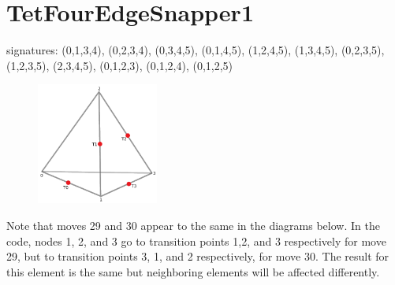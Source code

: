 \documentclass{article}
\begin{document}
\setcounter{subfigure}{0}
\clearpage


\section{TetFourEdgeSnapper1}

signatures: (0,1,3,4), (0,2,3,4), (0,3,4,5), (0,1,4,5), (1,2,4,5),
(1,3,4,5), (0,2,3,5), (1,2,3,5), (2,3,4,5), (0,1,2,3), (0,1,2,4),
(0,1,2,5)


\begin{figure}[h!]
\includegraphics[width=4cm]{TetFourEdgeSnapper1}
\end{figure}

Note that moves 29 and 30 appear to the same in the diagrams below.
In the code, nodes 1, 2, and 3 go to transition points 1,2, and 3
respectively for move 29, but to transition points 3, 1, and 2
respectively, for move 30.  The result for this element is the same
but neighboring elements will be affected differently.
\end{document}
